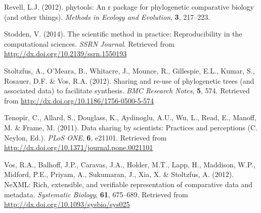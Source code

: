 \documentclass[author-year, review, 11pt]{components/elsarticle} %
\begin{document}
Revell, L.J. (2012). phytools: An r package for phylogenetic comparative
biology (and other things). \emph{Methods in Ecology and Evolution},
\textbf{3}, 217--223.

Stodden, V. (2014). The scientific method in practice: Reproducibility
in the computational sciences. \emph{SSRN Journal}. Retrieved from
\url{http://dx.doi.org/10.2139/ssrn.1550193}

Stoltzfus, A., O'Meara, B., Whitacre, J., Mounce, R., Gillespie, E.L.,
Kumar, S., Rosauer, D.F. \& Vos, R.A. (2012). Sharing and re-use of
phylogenetic trees (and associated data) to facilitate synthesis.
\emph{BMC Research Notes}, \textbf{5}, 574. Retrieved from
\url{http://dx.doi.org/10.1186/1756-0500-5-574}

Tenopir, C., Allard, S., Douglass, K., Aydinoglu, A.U., Wu, L., Read,
E., Manoff, M. \& Frame, M. (2011). Data sharing by scientists:
Practices and perceptions (C. Neylon, Ed.). \emph{PLoS ONE}, \textbf{6},
e21101. Retrieved from
\url{http://dx.doi.org/10.1371/journal.pone.0021101}

Vos, R.A., Balhoff, J.P., Caravas, J.A., Holder, M.T., Lapp, H.,
Maddison, W.P., Midford, P.E., Priyam, A., Sukumaran, J., Xia, X. \&
Stoltzfus, A. (2012). NeXML: Rich, extensible, and verifiable
representation of comparative data and metadata. \emph{Systematic
Biology}, \textbf{61}, 675--689. Retrieved from
\url{http://dx.doi.org/10.1093/sysbio/sys025}
\end{document}
